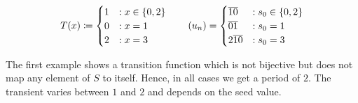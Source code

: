 \documentclass{stdlocal}
\begin{document}
  \hfill
  \begin{minipage}{0.73\textwidth}
    \[
      T(x) \define
      \begin{cases}
        1 &: x \in \set{0,2}{} \\
        0 &: x = 1 \\
        2 &: x = 3
      \end{cases}
      \separate
      (u_n) =
      \begin{cases}
        \overline{10} &: s_0 \in \set{0,2}{} \\
        \overline{01} &: s_0 = 1 \\
        2\overline{10} &: s_0 = 3
      \end{cases}
    \]
  \end{minipage}
  \medskip
  \par
  \noindent
  The first example shows a transition function which is not bijective but does not map any element of $S$ to itself.
  Hence, in all cases we get a period of $2$.
  The transient varies between $1$ and $2$ and depends on the seed value.
\end{document}
